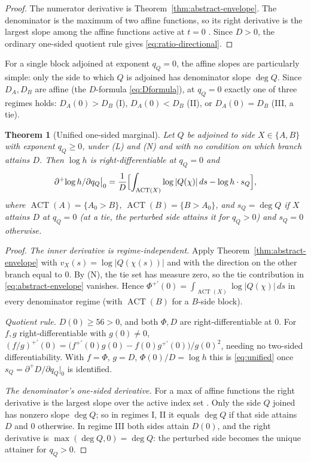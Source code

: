 \documentclass[11pt,reqno]{amsart}
\theoremstyle{plain}
\newtheorem{theorem}{Theorem}
\theoremstyle{definition}
\theoremstyle{remark}
\newcommand{\dplus}{\partial^{+}}
\newcommand{\dA}{D_A}
\newcommand{\dB}{D_B}
\DeclareMathOperator{\ACT}{ACT}
\begin{document}
\begin{proof}
The numerator derivative is Theorem~\ref{thm:abstract-envelope}.  The denominator is
the maximum of two affine functions, so its right derivative is the largest slope among
the affine functions active at $t=0$ \citep[Thm.~23.4]{Roc70}.  Since $D>0$, the
ordinary one-sided quotient rule gives \eqref{eq:ratio-directional}.
\end{proof}

For a single block adjoined at exponent $q_Q=0$, the affine slopes are particularly
simple: only the side to which $Q$ is adjoined has denominator slope $\deg Q$.  Since
$\dA,\dB$ are affine (the $D$-formula \eqref{eq:Dformula}), at $q_Q=0$ exactly one of
three regimes holds: $\dA(0)>\dB$ (I), $\dA(0)<\dB$ (II), or $\dA(0)=\dB$ (III, a tie).

\begin{theorem}[Unified one-sided marginal]\label{thm:unified}
Let $Q$ be adjoined to side $X\in\{A,B\}$ with exponent $q_Q\ge0$, under
\emph{(L)} and \emph{(N)} and with no condition on which branch attains $D$. Then
$\log h$ is right-differentiable at $q_Q=0$ and
\begin{equation}\label{eq:unified}
  \dplus\!\log h/\partial q_Q\big|_0
  =\frac1D\Bigl[\int_{\ACT(X)}\log|Q(\chi)|\,ds-\log h\cdot s_Q\Bigr],
\end{equation}
where $\ACT(A)=\{A_0>B\}$, $\ACT(B)=\{B>A_0\}$, and $s_Q=\deg Q$ if $X$ attains $D$ at
$q_Q=0$ (at a tie, the perturbed side attains it for $q_Q>0$) and $s_Q=0$ otherwise.
\end{theorem}

\begin{proof}
\emph{The inner derivative is regime-independent.} Apply
Theorem~\ref{thm:abstract-envelope} with $v_X(s)=\log|Q(\chi(s))|$ and with the
direction on the other branch equal to $0$.  By (N), the tie set has measure zero, so
the tie contribution in \eqref{eq:abstract-envelope} vanishes.  Hence
$\Phi^{+\prime}(0)=\int_{\ACT(X)}\log|Q(\chi)|\,ds$ in every denominator regime (with
$\ACT(B)$ for a $B$-side block).

\emph{Quotient rule.} $D(0)\ge56>0$, and both $\Phi,D$ are right-differentiable at
$0$. For $f,g$ right-differentiable with $g(0)\ne0$,
$(f/g)^{+\prime}(0)=\bigl(f^{+\prime}(0)g(0)-f(0)g^{+\prime}(0)\bigr)/g(0)^2$, needing
no two-sided differentiability. With $f=\Phi$, $g=D$, $\Phi(0)/D=\log h$ this is
\eqref{eq:unified} once $s_Q=\dplus D/\partial q_Q|_0$ is identified.

\emph{The denominator's one-sided derivative.} For a max of affine functions the
right derivative is the largest slope over the active index set
\citep[Thm.~23.4]{Roc70}. Only the side $Q$ joined has nonzero slope $\deg Q$; so in
regimes I, II it equals $\deg Q$ if that side attains $D$ and $0$ otherwise. In
regime III both sides attain $D(0)$, and the right derivative is $\max(\deg Q,0)=\deg
Q$: the perturbed side becomes the unique attainer for $q_Q>0$.
\end{proof}
\end{document}
